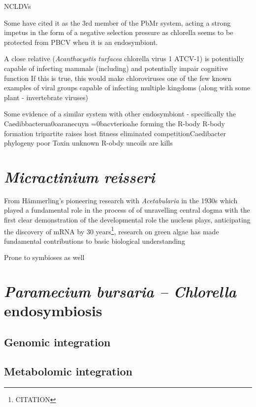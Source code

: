 NCLDVs 

Some have cited it as the 3rd member of the PbMr system, acting a strong impetus in the form of a negative
selection pressure as chlorella seems to be protected from PBCV when it is an endosymbiont.


A close relative (\textit{Acanthocystis turfacea} chlorella virus 1 ATCV-1) is potentially capable of 
infecting mammals (including) and potentially impair cognitive function
If this is true, this would make chloroviruses one of the few known examples of viral groups capable of infecting 
multiple kingdoms (along with some plant - invertebrate viruses) \citep{Yolken2014}


Some evidence of a similar system with other endosymbiont - specifically the Caedibbacterua0oaranecuyn =0bacvterioahe
forming the R-body
R-body formation tripartite raises host fitness eliminated competitionCaedibacter phylogeny poor Toxin unknown
R-obdy uncoils are kills  \citep{Schrallhammer2009}




\section{\textit{Micractinium reisseri}}

From H\"ammerling's pioneering research with \textit{Acetabularia} in the 1930s 
which played a fundamental role in the process of 
of unravelling central dogma with the first clear demonstration of the 
developmental role the nucleus plays, anticipating the discovery of mRNA by 30 years\footnote{CITATION}, research on green algae has made fundamental contributions
to basic biological understanding

Prone to symbioses as well


\section{\textit{Paramecium bursaria – Chlorella} endosymbiosis}

\subsection{Genomic integration}

\subsection{Metabolomic integration}


